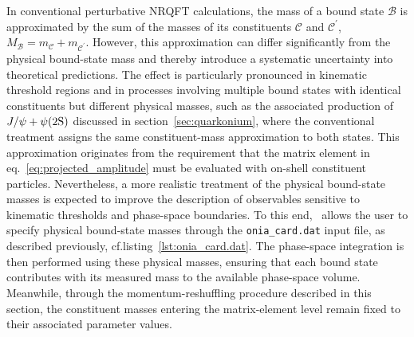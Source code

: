 In conventional perturbative NRQFT calculations, the mass of a bound state $\mathcal{B}$ is approximated by the sum of the masses of its constituents $\mathcal{C}$ and $\mathcal{C}^\prime$, $M_{\mathcal{B}}=m_{\mathcal{C}}+m_{\mathcal{C}^\prime}$. However, this approximation can differ significantly from the physical bound-state mass and thereby introduce a systematic uncertainty into theoretical predictions. The effect is particularly pronounced in kinematic threshold regions and in processes involving multiple bound states with identical constituents but different physical masses, such as the associated production of $J/\psi + \psi(2\mathrm{S})$ discussed in section~\ref{sec:quarkonium}, where the conventional treatment assigns the same constituent-mass approximation to both states.
This approximation originates from the requirement that the matrix element in eq.~\eqref{eq:projected_amplitude} must be evaluated with on-shell constituent particles. Nevertheless, a more realistic treatment of the physical bound-state masses is expected to improve the description of observables sensitive to kinematic thresholds and phase-space boundaries. To this end, \mgshort\ allows the user to specify physical bound-state masses through the \texttt{onia\_card.dat} input file, as described previously, cf.\@ listing~\ref{lst:onia_card.dat}. The phase-space integration is then performed using these physical masses, ensuring that each bound state contributes with its measured mass to the available phase-space volume. Meanwhile, through the momentum-reshuffling procedure described in this section, the constituent masses entering the matrix-element level remain fixed to their associated parameter values.
 
